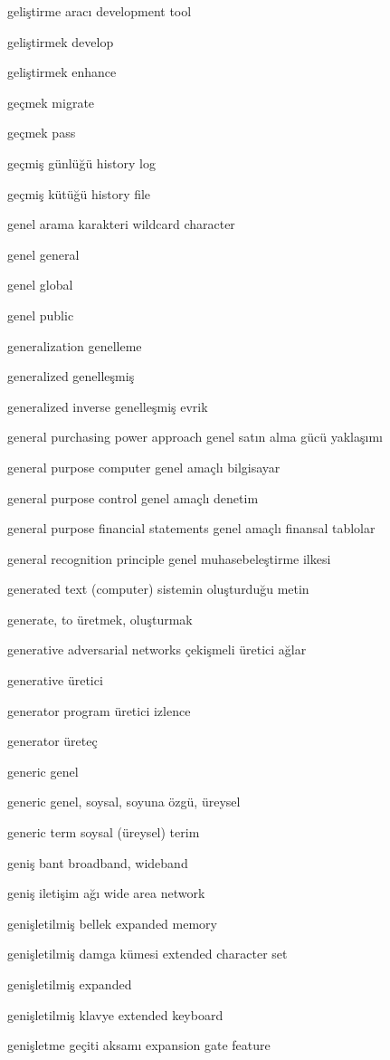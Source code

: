 \documentclass[12pt,fleqn]{article}\usepackage{../../common}
\begin{document}
geliştirme aracı development tool

geliştirmek develop

geliştirmek enhance

geçmek migrate

geçmek pass

geçmiş günlüğü history log

geçmiş kütüğü history file

genel arama karakteri wildcard character

genel general

genel global

genel public

generalization genelleme

generalized genelleşmiş

generalized inverse genelleşmiş evrik

general purchasing power approach genel satın alma gücü yaklaşımı

general purpose computer genel amaçlı bilgisayar

general purpose control genel amaçlı denetim

general purpose financial statements genel amaçlı finansal tablolar

general recognition principle genel muhasebeleştirme ilkesi

generated text (computer) sistemin oluşturduğu metin

generate, to üretmek, oluşturmak

generative adversarial networks çekişmeli üretici ağlar

generative üretici

generator program üretici izlence

generator üreteç

generic genel

generic genel, soysal, soyuna özgü, üreysel

generic term soysal (üreysel) terim

geniş bant broadband, wideband

geniş iletişim ağı wide area network

genişletilmiş bellek expanded memory

genişletilmiş damga kümesi extended character set

genişletilmiş expanded

genişletilmiş klavye extended keyboard

genişletme geçiti aksamı expansion gate feature
\end{document}
